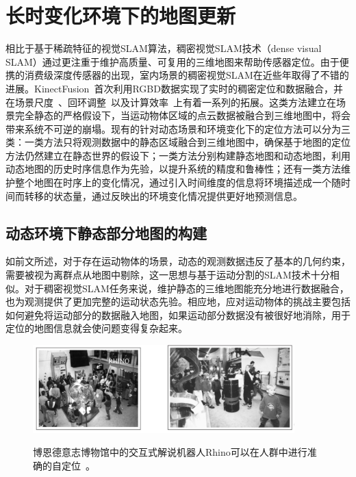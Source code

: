 \section{长时变化环境下的地图更新}
\label{sec:mapping}
相比于基于稀疏特征的视觉SLAM算法，稠密视觉SLAM技术（dense visual SLAM）通过更注重于维护高质量、可复用的三维地图来帮助传感器定位。由于便携的消费级深度传感器的出现，室内场景的稠密视觉SLAM在近些年取得了不错的进展。KinectFusion~\cite{kinectFusion}首次利用RGBD数据实现了实时的稠密定位和数据融合，并在场景尺度~\cite{voxelHashing}、回环调整~\cite{kintinuous}以及计算效率~\cite{CPUmapping}上有着一系列的拓展。这类方法建立在场景完全静态的严格假设下，当运动物体区域的点云数据被融合到三维地图中，将会带来系统不可逆的崩塌。现有的针对动态场景和环境变化下的定位方法可以分为三类：一类方法只将观测数据中的静态区域融合到三维地图中，确保基于地图的定位方法仍然建立在静态世界的假设下；一类方法分别构建静态地图和动态地图，利用动态地图的历史时序信息作为先验，以提升系统的精度和鲁棒性；还有一类方法维护整个地图在时序上的变化情况，通过引入时间维度的信息将环境描述成一个随时间而转移的状态量，通过反映出的环境变化情况提供更好地预测信息。

\subsection{动态环境下静态部分地图的构建}
\label{subsec:object-centered_mapping}
如前文所述，对于存在运动物体的场景，动态的观测数据违反了基本的几何约束，需要被视为离群点从地图中剔除，这一思想与基于运动分割的SLAM技术十分相似。对于稠密视觉SLAM任务来说，维护静态的三维地图能充分地进行数据融合，也为观测提供了更加完整的运动状态先验。相应地，应对运动物体的挑战主要包括如何避免将运动部分的数据融入地图，如果运动部分数据没有被很好地消除，用于定位的地图信息就会使问题变得复杂起来。

\begin{figure}[thbp]
	\centering
	\includegraphics[width=0.9\textwidth]{figs/2-1/early.jpeg}
	\label{fig:rhino}
	\caption{博恩德意志博物馆中的交互式解说机器人Rhino可以在人群中进行准确的自定位~\cite{fox1999}。}
\end{figure}

